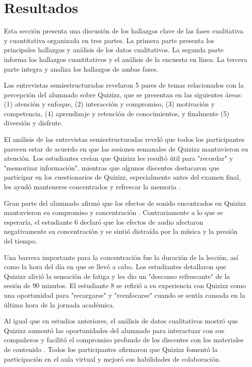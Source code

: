 \documentclass[spanish]{textolivre}
\begin{document}
\section{Resultados}\label{sec-4}
Esta sección presenta una discusión de los hallazgos clave de las fases cualitativa y cuantitativa organizada en tres partes. La primera parte presenta los principales hallazgos y análisis de los datos cualitativos. La segunda parte informa los hallazgos cuantitativos y el análisis de la encuesta en línea. La tercera parte integra y analiza los hallazgos de ambas fases.

Las entrevistas semiestructuradas revelaron 5 pares de temas relacionados con la percepción del alumnado sobre Quizizz, que se presentan en las siguientes áreas: (1) atención y enfoque, (2) interacción y compromiso, (3) motivación y competencia, (4) aprendizaje y retención de conocimientos, y finalmente (5) diversión y disfrute.

El análisis de las entrevistas semiestructuradas reveló que todos los participantes parecen estar de acuerdo en que las sesiones semanales de Quizizz mantuvieron su atención. Los estudiantes creían que Quizizz les resultó útil para "recordar" y "memorizar información", mientras que algunos discentes destacaron que participar en los cuestionarios de Quizizz, especialmente antes del examen final, les ayudó mantenerse concentrados y refrescar la memoria \cite{licorish2018, vygotskii1978}.

Gran parte del alumnado afirmó que los efectos de sonido encontrados en Quizizz mantuvieron su compromiso y concentración \cite{malone1981, yunus2021}. Contrariamente a lo que se esperaría, el estudiante 6 declaró que los efectos de audio afectaron negativamente su concentración y se sintió distraída por la música y la presión del tiempo.

Una barrera importante para la concentración fue la duración de la lección, así como la hora del día en que se llevó a cabo. Los estudiantes detallaron que Quizizz alivió la sensación de fatiga y les dio un "descanso refrescante" de la sesión de 90 minutos. El estudiante 8 se refirió a su experiencia con Quizizz como una oportunidad para "recargarse" y "reenfocarse" cuando se sentía cansada en la última hora de la jornada académica.

Al igual que en estudios anteriores, el análisis de datos cualitativos mostró que Quizizz aumentó las oportunidades del alumnado para interactuar con sus compañeros y facilitó el compromiso profundo de los discentes con los materiales de contenido \cite{awedh2014, hung2017, mendez2013, wang2015}. Todos los participantes afirmaron que Quizizz fomentó la participación en el aula virtual y mejoró sus habilidades de colaboración.
\end{document}
